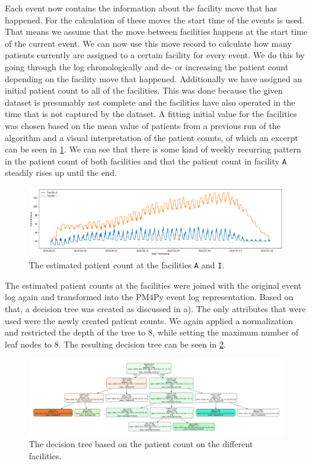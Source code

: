 \documentclass[12pt]{report}
\begin{document}
Each event now contains the information about the facility move that has happened. For the calculation of these moves the start time of the events is used. That means we assume that the move between facilities happens at the start time of the current event. We can now use this move record to calculate how many patients currently are assigned to a certain facility for every event. We do this by going through the log chronologically and de- or increasing the patient count depending on the facility move that happened. Additionally we have assigned an initial patient count to all of the facilities. This was done because the given dataset is presumably not complete and the facilities have also operated in the time that is not captured by the dataset. A fitting initial value for the facilities was chosen based on the mean value of patients from a previous run of the algorithm and a visual interpretation of the patient counts, of which an excerpt can be seen in \ref{fig:figures-q4-fac-count-png}. We can see that there is some kind of weekly recurring pattern in the patient count of both facilities and that the patient count in facility \texttt{A} steadily rises up until the end.

\begin{figure}[h]
    \centering
    \includegraphics[width=\textwidth]{figures/q4_fac_count.png}
    \caption{The estimated patient count at the facilities \texttt{A} and \texttt{I}.}
    \label{fig:figures-q4-fac-count-png}
\end{figure}

The estimated patient counts at the facilities were joined with the original event log again and transformed into the PM4Py event log representation. Based on that, a decision tree was created as discussed in a). The only attributes that were used were the newly created patient counts. We again applied a normalization and restricted the depth of the tree to 8, while setting the maximum number of leaf nodes to 8. The resulting decision tree can be seen in \ref{fig:figures-q4-facility-tree-png}.

\begin{figure}[h]
    \centering
    \includegraphics[width=\textwidth]{figures/q4_facility_tree.pdf}
    \caption{The decision tree based on the patient count on the different facilities.}
    \label{fig:figures-q4-facility-tree-png}
\end{figure}
\end{document}
